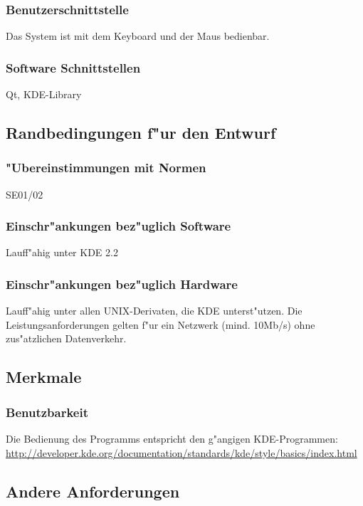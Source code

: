 \subsubsection{Benutzerschnittstelle}
Das System ist mit dem Keyboard und der Maus bedienbar.

\subsubsection{Software Schnittstellen}
Qt, KDE-Library

\subsection{Randbedingungen f"ur den Entwurf}

\subsubsection{"Ubereinstimmungen mit Normen}
SE01/02

\subsubsection{Einschr"ankungen bez"uglich Software}
Lauff"ahig unter KDE 2.2

\subsubsection{Einschr"ankungen bez"uglich Hardware}
Lauff"ahig unter allen UNIX-Derivaten, die KDE unterst"utzen. Die Leistungsanforderungen gelten f"ur ein Netzwerk (mind. 10Mb/s)
ohne zus"atzlichen Datenverkehr.

\subsection{Merkmale}

\subsubsection{Benutzbarkeit}
Die Bedienung des Programms entspricht den g"angigen KDE-Programmen:\\
\href{http://developer.kde.org/documentation/standards/kde/style/basics/index.html}{http://developer.kde.org/documentation/standards/kde/style/basics/index.html}

\subsection{Andere Anforderungen}

